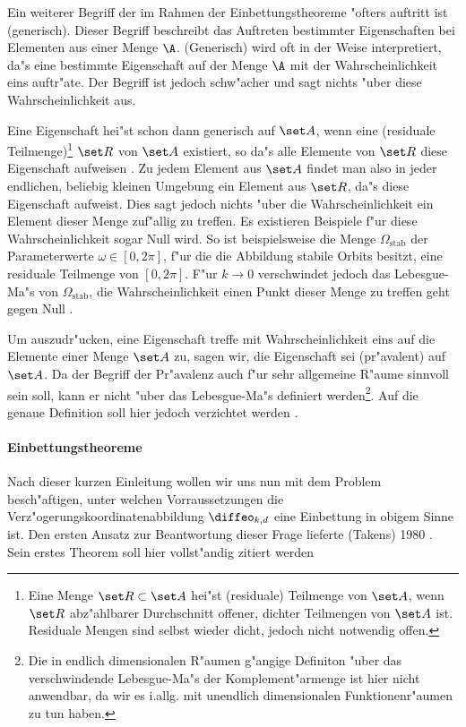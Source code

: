 Ein weiterer Begriff der im Rahmen der Einbettungstheoreme "ofters auftritt 
ist \naja(generisch). Dieser Begriff beschreibt das Auftreten bestimmter Eigenschaften bei 
Elementen aus einer Menge $\A$. 
 \naja(Generisch) wird oft in der Weise interpretiert, da"s eine bestimmte Eigenschaft auf
der Menge $\A$ mit der Wahrscheinlichkeit eins 
auftr"ate. Der Begriff ist jedoch schw"acher und sagt nichts "uber diese
Wahrscheinlichkeit aus. 

Eine \label{generisch} Eigenschaft hei"st schon dann generisch auf $\set A$, wenn
eine \begriff(residuale Teilmenge)\footnote{Eine Menge $\set R\subset\set A$ hei"st
\begriff(residuale) Teilmenge von $\set A$, wenn $\set R$ abz"ahlbarer Durchschnitt
offener, dichter Teilmengen von $\set A$ ist. Residuale Mengen sind selbst wieder dicht, jedoch nicht notwendig offen. }
 $\set R$ von $\set A$ existiert, so
da"s alle Elemente von $\set R$ diese Eigenschaft aufweisen \cite{Liebert91}.
Zu jedem Element aus $\set A$ findet man also in
jeder endlichen, beliebig kleinen Umgebung ein Element aus $\set R$, da"s diese
Eigenschaft aufweist. Dies sagt jedoch nichts "uber die
Wahrscheinlichkeit ein Element dieser Menge zuf"allig zu treffen. Es existieren Beispiele
f"ur diese Wahrscheinlichkeit sogar Null wird. So ist beispielsweise
die Menge $\Omega_{\text{stab}}$ der Parameterwerte $\omega\in[0,2\pi]$, f"ur die die Abbildung 
stabile Orbits besitzt, eine residuale Teilmenge von $[0,2\pi]$. F"ur $k\to0$ verschwindet
jedoch das Lebesgue-Ma"s von $\Omega_{\text{stab}}$, die Wahrscheinlichkeit einen Punkt
dieser Menge zu treffen geht  gegen Null \cite{sauer91}.

Um auszudr"ucken, eine Eigenschaft treffe mit Wahrscheinlichkeit eins auf die Elemente
einer Menge $\set A$ zu, sagen wir, die Eigenschaft sei \begriff(pr"avalent) auf $\set
A$. Da der Begriff der Pr"avalenz auch f"ur sehr allgemeine R"aume sinnvoll sein soll,
kann er nicht "uber das Lebesgue-Ma"s definiert werden\footnote{Die in endlich dimensionalen R"aumen
g"angige Definiton "uber das verschwindende Lebesgue-Ma"s der Komplement"armenge ist hier
nicht anwendbar, da wir es i.allg. mit unendlich dimensionalen Funktionenr"aumen zu tun
haben.}. Auf die genaue Definition soll hier jedoch verzichtet werden \cite{sauer91}.

\paragraph{Einbettungstheoreme}
Nach dieser kurzen Einleitung 
 wollen wir uns nun mit dem Problem besch"aftigen, unter welchen Vorraussetzungen die
Verz"ogerungskoordinatenabbildung $\diffeo_{k,d}$ eine Einbettung in obigem Sinne ist. Den 
ersten Ansatz zur Beantwortung dieser Frage lieferte \autor(Takens) 1980 \cite{takens80}.
Sein erstes Theorem soll hier vollst"andig zitiert werden

